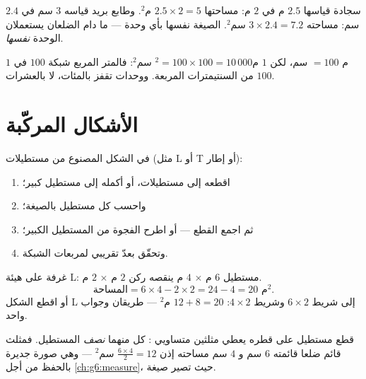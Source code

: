 \begin{example}\label{ex:g5:areas:rectangle}
سجادة قياسها $2.5$ م في $2$ م: مساحتها $2.5 \times 2 = 5$ م$^2$.
وطابع بريد قياسه $3$ سم في $2.4$ سم: مساحته $3 \times 2.4 = 7.2$
سم$^2$. الصيغة نفسها بأي وحدة --- ما دام الضلعان يستعملان
الوحدة \emph{نفسها}.
\end{example}

\begin{example}\label{ex:g5:areas:units}
$1$ م $= 100$ سم، لكن $1$ م$^2 = 100 \times 100 = 10\,000$ سم$^2$:
فالمتر المربع شبكة $100$ في $100$ من السنتيمترات المربعة. ووحدات
 تقفز بالمئات، لا بالعشرات.
\end{example}

\section{الأشكال المركّبة}

\begin{method}\label{met:g5:areas:composite}
في الشكل المصنوع من مستطيلات (مثل L أو T أو إطار):
\begin{enumerate}
  \item اقطعه إلى مستطيلات، أو أكمله إلى مستطيل كبير؛
  \item واحسب  كل مستطيل بالصيغة؛
  \item ثم اجمع القطع --- أو اطرح الفجوة من المستطيل
        الكبير؛
  \item وتحقّق بعدّ تقريبي لمربعات الشبكة.
\end{enumerate}
\end{method}

\begin{example}\label{ex:g5:areas:composite}
غرفة على هيئة L: مستطيل $6$ م $\times$ $4$ م ينقصه ركن
$2$ م $\times$ $2$ م.
\[
\text{المساحة} = 6 \times 4 - 2 \times 2 = 24 - 4 = 20 \text{ م}^2 .
\]
أو اقطع الشكل L إلى شريط $6 \times 2$ وشريط $4 \times 2$:
$12 + 8 = 20$ م$^2$ --- طريقان وجواب واحد.
\end{example}

\begin{example}\label{ex:g5:areas:halfrect}
قطع مستطيل على قطره يعطي مثلثين متساويي
: كل منهما \emph{نصف} المستطيل. فمثلث قائم ضلعا قائمته
$6$ سم و $4$ سم مساحته إذن $\frac{6 \times 4}{2} = 12$
سم$^2$ --- وهي صورة جديرة بالحفظ من أجل
\cref{ch:g6:measure}، حيث تصير صيغة.
\end{example}

